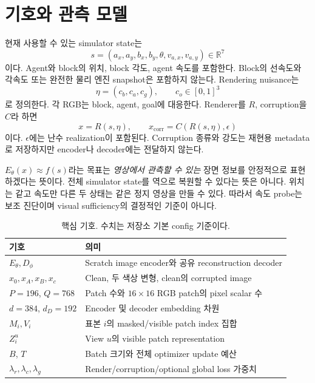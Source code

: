 \documentclass[11pt,a4paper]{article}
\newcommand{\R}{\mathbb{R}}
\begin{document}
\section{기호와 관측 모델}
현재 사용할 수 있는 simulator state는
\begin{equation}
s=(a_x,a_y,b_x,b_y,\theta,v_{a,x},v_{a,y})\in\R^7
\end{equation}
이다. Agent와 block의 위치, block 각도, agent 속도를 포함한다. Block의 선속도와
각속도 또는 완전한 물리 엔진 snapshot은 포함하지 않는다.
Rendering nuisance는
\begin{equation}
\eta=(c_b,c_a,c_g),\qquad c_o\in[0,1]^3
\end{equation}
로 정의한다. 각 RGB는 block, agent, goal에 대응한다. Renderer를 $R$,
corruption을 $C$라 하면
\begin{equation}
x=R(s,\eta),\qquad x_{\mathrm{corr}}=C(R(s,\eta),\epsilon)
\end{equation}
이다. $\epsilon$에는 난수 realization이 포함된다. Corruption 종류와 강도는
재현용 metadata로 저장하지만 encoder나 decoder에는 전달하지 않는다.

$E_\theta(x)\approx f(s)$라는 목표는 \emph{영상에서 관측할 수 있는} 장면 정보를
안정적으로 표현하겠다는 뜻이다. 전체 simulator state를 역으로 복원할 수 있다는
뜻은 아니다. 위치는 같고 속도만 다른 두 상태는 같은 정지 영상을 만들 수 있다.
따라서 속도 probe는 보조 진단이며 visual sufficiency의 결정적인 기준이 아니다.

\begin{table}[htbp]\centering\small
\begin{tabularx}{\linewidth}{lX}
\toprule 기호 & 의미 \\\midrule
$E_\theta,D_\phi$ & Scratch image encoder와 공유 reconstruction decoder \\
$x_0,x_A,x_B,x_c$ & Clean, 두 색상 변형, clean의 corrupted image \\
$P=196$, $Q=768$ & Patch 수와 $16\times16$ RGB patch의 pixel scalar 수 \\
$d=384$, $d_D=192$ & Encoder 및 decoder embedding 차원 \\
$M_i,V_i$ & 표본 $i$의 masked/visible patch index 집합 \\
$Z_i^u$ & View $u$의 visible patch representation \\
$B$, $T$ & Batch 크기와 전체 optimizer update 예산 \\
$\lambda_r,\lambda_c,\lambda_g$ & Render/corruption/optional global loss 가중치 \\\bottomrule
\end{tabularx}
\caption{핵심 기호. 수치는 저장소 기본 config 기준이다.}
\end{table}
\end{document}
